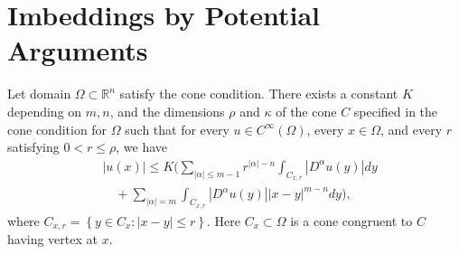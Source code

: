\section{Imbeddings by Potential Arguments}


\begin{lemma}
  Let domain $\Omega \subset \mathbb{R}^n$ satisfy the cone condition. There exists a constant $K$ 
  depending on $m, n$, and the dimensions $\rho$ and $\kappa$ of the cone $C$ specified in the 
  cone condition for $\Omega$ such that for every $u \in C^{\infty}(\Omega)$,
  every $x \in \Omega$, and every $r$ satisfying $0<r \leq \rho$, we have
  \begin{equation}
    \begin{aligned}
      & |u(x)| \leq K\Biggl(\sum_{|\alpha| \leq m-1} r^{|\alpha|-n} \int_{C_{x,r}}\left|D^\alpha u(y)\right| d y \\
      & \quad+\sum_{|\alpha|=m} \int_{C_{x,r}}\left|D^\alpha u(y)\right||x-y|^{m-n} d y\Biggr),
    \end{aligned}
  \end{equation}
  where $C_{x,r}=\left\{y \in C_x:|x-y| \leq r\right\}$. Here $C_x \subset \Omega$ is a cone 
  congruent to $C$ having vertex at $x$.
\end{lemma}

